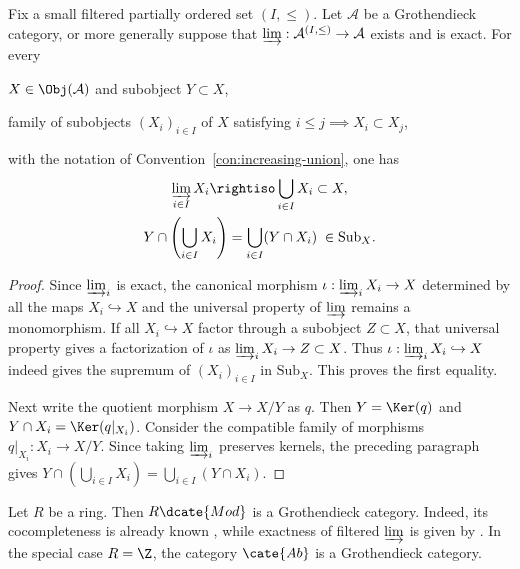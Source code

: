 \begin{proposition}\label{prop:Grothendieck-cat-intersection}
Fix a small filtered partially ordered set $(I,\leq)$. Let $\mathcal{A}$ be a
Grothendieck category, or more generally suppose that
$\varinjlim:\mathcal{A}^{(I,\leq)}\to\mathcal{A}$ exists and is exact. For
every
\begin{compactitem}
	\item $X\in\Obj(\mathcal{A})$ and subobject $Y\subset X$,
	\item family of subobjects $\left(X_i\right)_{i\in I}$ of $X$ satisfying
	$i\leq j\implies X_i\subset X_j$,
\end{compactitem}
with the notation of Convention~\ref{con:increasing-union}, one has
\begin{gather*}
	\varinjlim_{i\in I}X_i\rightiso\bigcup_{i\in I}X_i\subset X,\\
	Y\cap\left(\bigcup_{i\in I}X_i\right)
	=\bigcup_{i\in I}(Y\cap X_i)\;\in\mathrm{Sub}_X.
\end{gather*}
\end{proposition}
\begin{proof}
Since $\varinjlim_i$ is exact, the canonical morphism
$\iota:\varinjlim_iX_i\to X$ determined by all the maps
$X_i\hookrightarrow X$ and the universal property of $\varinjlim$ remains a
monomorphism. If all $X_i\hookrightarrow X$ factor through a subobject
$Z\subset X$, that universal property gives a factorization of $\iota$ as
$\varinjlim_iX_i\to Z\subset X$. Thus
$\iota:\varinjlim_iX_i\hookrightarrow X$ indeed gives the supremum of
$(X_i)_{i\in I}$ in $\mathrm{Sub}_X$. This proves the first equality.

Next write the quotient morphism $X\to X/Y$ as $q$. Then $Y=\Ker(q)$ and
$Y\cap X_i=\Ker(q|_{X_i})$. Consider the compatible family of morphisms
$q|_{X_i}:X_i\to X/Y$. Since taking $\varinjlim_i$ preserves kernels, the
preceding paragraph gives
$Y\cap\left(\bigcup_{i\in I}X_i\right)=
\bigcup_{i\in I}(Y\cap X_i)$.
\end{proof}

\begin{example}
Let $R$ be a ring. Then $R\dcate{Mod}$ is a Grothendieck category. Indeed, its
cocompleteness is already known \cite[Theorem 6.2.2]{Li1}, while exactness of
filtered $\varinjlim$ is given by \cite[Lemma 6.8.3]{Li1}. In the special case
$R=\Z$, the category $\cate{Ab}$ is a Grothendieck category.
\end{example}

